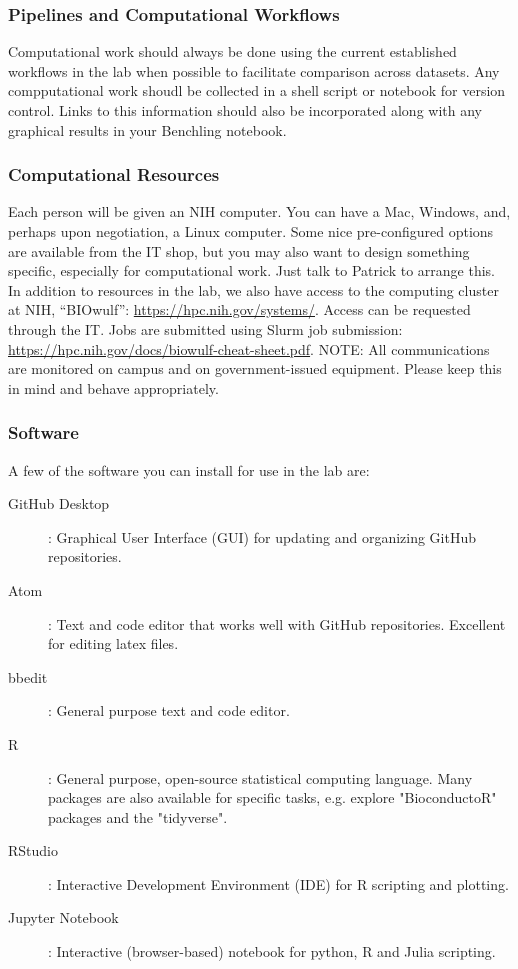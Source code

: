 \documentclass[10pt, a4paper, twocolumn]{article} %
\begin{document}
\subsubsection{Pipelines and Computational Workflows}
Computational work should always be done using the current established workflows in the lab when possible to facilitate comparison across datasets. Any compputational work shoudl be collected in a shell script or notebook for version control. Links to this information should also be incorporated along with any graphical results in your Benchling notebook.

\subsubsection{Computational Resources}
Each person will be given an NIH computer. You can have a Mac, Windows, and, perhaps upon negotiation, a Linux computer. Some nice pre-configured options are available from the IT shop, but you may also want to design something specific, especially for computational work. Just talk to Patrick to arrange this.
In addition to resources in the lab, we also have access to the computing cluster at NIH, “BIOwulf”: \href{https://hpc.nih.gov/systems/}{https://hpc.nih.gov/systems/}. Access can be requested through the IT. Jobs are submitted using Slurm job submission: \href{https://hpc.nih.gov/docs/biowulf-cheat-sheet.pdf}{https://hpc.nih.gov/docs/biowulf-cheat-sheet.pdf}.
\newline
NOTE: All communications are monitored on campus and on government-issued equipment. Please keep this in mind and behave appropriately.

\subsubsection{Software}
A few of the software you can install for use in the lab are:
\begin{description}
\item [GitHub Desktop]: Graphical User Interface (GUI) for updating and organizing GitHub repositories.
\item [Atom]: Text and code editor that works well with GitHub repositories. Excellent for editing latex files.
\item [bbedit]: General purpose text and code editor.
\item [R]: General purpose, open-source statistical computing language. Many packages are also available for specific tasks, e.g. explore "BioconductoR" packages and the "tidyverse".
\item [RStudio]: Interactive Development Environment (IDE) for R scripting and plotting.
\item [Jupyter Notebook]: Interactive (browser-based) notebook for python, R and Julia scripting.
\end{description}
\end{document}
